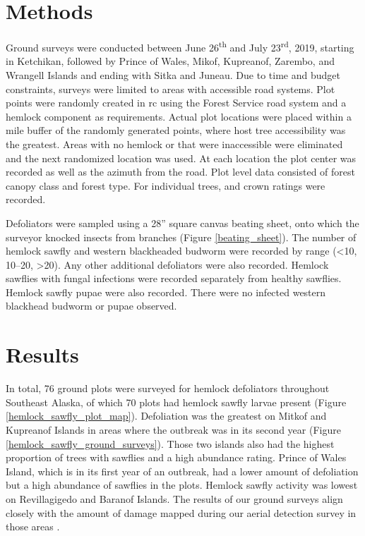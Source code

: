 \begin{multicols}{2}
\section{Methods}

Ground surveys were conducted between June 26\textsuperscript{th} and July 23\textsuperscript{rd}, 2019, starting in Ketchikan, followed by Prince of Wales, Mikof, Kupreanof, Zarembo, and Wrangell Islands and ending with Sitka and Juneau.  Due to time and budget constraints, surveys were limited to areas with accessible road systems.  Plot points were randomly created in rc using the Forest Service road system and a hemlock component as requirements.  Actual plot locations were placed within a  mile buffer of the randomly generated points, where host tree accessibility was the greatest.  Areas with no hemlock or that were inaccessible were eliminated and the next randomized location was used.   At each location the plot center was recorded as well as the azimuth from the road.  Plot level data consisted of forest canopy class and forest type. For individual trees,  and crown ratings were recorded. 

Defoliators were sampled using a 28” square canvas beating sheet, onto which the surveyor knocked insects from branches (Figure \ref{beating_sheet}).  The number of hemlock sawfly and western blackheaded budworm were recorded by range (<10, 10--20, >20). Any other additional defoliators were also recorded.  Hemlock sawflies with fungal infections were recorded separately from healthy sawflies.  Hemlock sawfly pupae were also recorded.  There were no infected western blackhead budworm or pupae observed. 

\section{Results}
 
In total, 76 ground plots were surveyed for hemlock defoliators throughout Southeast Alaska, of which 70 plots had hemlock sawfly larvae present (Figure \ref{hemlock_sawfly_plot_map}).  Defoliation was the greatest on Mitkof and Kupreanof Islands in areas where the outbreak was in its second year (Figure \ref{hemlock_sawfly_ground_surveys}).  Those two islands also had the highest proportion of trees with sawflies and a high abundance rating.  Prince of Wales Island, which is in its first year of an outbreak, had a lower amount of defoliation but a high abundance of sawflies in the plots. Hemlock sawfly activity was lowest on Revillagigedo and Baranof Islands.   The results of our ground surveys align closely with the amount of damage mapped during our aerial detection survey in those areas \citep[see][]{Duboisetal2020}. 


\end{multicols}

